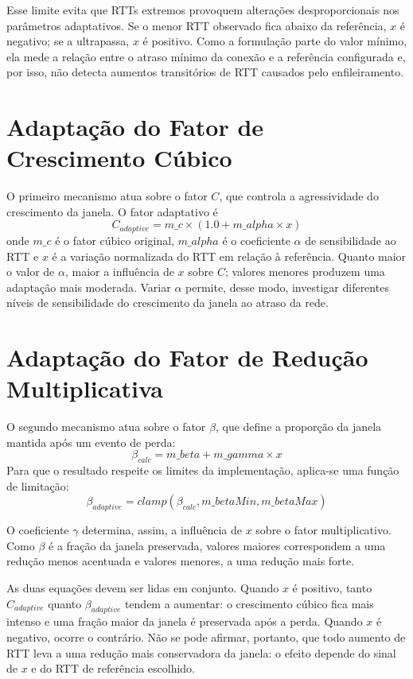 Esse limite evita que RTTs extremos provoquem alterações desproporcionais nos parâmetros adaptativos. Se o menor RTT observado fica abaixo da referência, $x$ é negativo; se a ultrapassa, $x$ é positivo. Como a formulação parte do valor mínimo, ela mede a relação entre o atraso mínimo da conexão e a referência configurada e, por isso, não detecta aumentos transitórios de RTT causados pelo enfileiramento.

\section{Adaptação do Fator de Crescimento Cúbico}

O primeiro mecanismo atua sobre o fator $C$, que controla a agressividade do crescimento da janela. O fator adaptativo é
\begin{equation}
C_{adaptive} =
m\_c \times (1.0 + m\_alpha \times x)
\end{equation}
onde $m\_c$ é o fator cúbico original, $m\_alpha$ é o coeficiente $\alpha$ de sensibilidade ao RTT e $x$ é a variação normalizada do RTT em relação à referência. Quanto maior o valor de $\alpha$, maior a influência de $x$ sobre $C$; valores menores produzem uma adaptação mais moderada. Variar $\alpha$ permite, desse modo, investigar diferentes níveis de sensibilidade do crescimento da janela ao atraso da rede.

\section{Adaptação do Fator de Redução Multiplicativa}

O segundo mecanismo atua sobre o fator $\beta$, que define a proporção da janela mantida após um evento de perda:
\begin{equation}
\beta_{calc} =
m\_beta + m\_gamma \times x
\end{equation}
Para que o resultado respeite os limites da implementação, aplica-se uma função de limitação:
\begin{equation}
\beta_{adaptive} =
clamp(\beta_{calc}, m\_betaMin, m\_betaMax)
\end{equation}

O coeficiente $\gamma$ determina, assim, a influência de $x$ sobre o fator multiplicativo. Como $\beta$ é a fração da janela preservada, valores maiores correspondem a uma redução menos acentuada e valores menores, a uma redução mais forte.

As duas equações devem ser lidas em conjunto. Quando $x$ é positivo, tanto $C_{adaptive}$ quanto $\beta_{adaptive}$ tendem a aumentar: o crescimento cúbico fica mais intenso e uma fração maior da janela é preservada após a perda. Quando $x$ é negativo, ocorre o contrário. Não se pode afirmar, portanto, que todo aumento de RTT leva a uma redução mais conservadora da janela: o efeito depende do sinal de $x$ e do RTT de referência escolhido.

